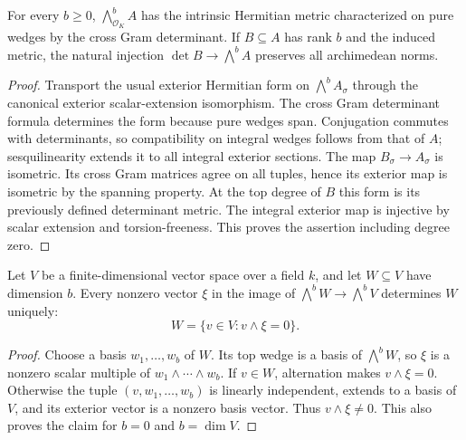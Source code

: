 \begin{lemma}
\label{lem:intrinsic-exterior-metric}
\leanok
For every $b\geq0$, $\bigwedge^b_{\mathcal O_K}A$ has the intrinsic
Hermitian metric characterized on pure wedges by the cross Gram determinant.
If $B\subseteq A$ has rank $b$ and the induced metric, the natural injection
$\det B\longrightarrow\bigwedge^b A$ preserves all archimedean norms.
\end{lemma}
\begin{proof}
Transport the usual exterior Hermitian form on $\bigwedge^b A_\sigma$
through the canonical exterior scalar-extension isomorphism. The cross Gram
determinant formula determines the form because pure wedges span. Conjugation
commutes with determinants, so compatibility on integral wedges follows from
that of $A$; sesquilinearity extends it to all integral exterior sections.
The map $B_\sigma\to A_\sigma$ is isometric. Its cross Gram matrices agree
on all tuples, hence its exterior map is isometric by the spanning property.
At the top degree of $B$ this form is its previously defined determinant
metric. The integral exterior map is injective by scalar extension and
torsion-freeness. This proves the assertion including degree zero.
\end{proof}

\begin{lemma}
\label{lem:plucker-recovery}\leanok
{}
Let $V$ be a finite-dimensional vector space over a field $k$, and let
$W\subseteq V$ have dimension $b$. Every nonzero vector $\xi$ in the
image of $\bigwedge^b W\to\bigwedge^b V$ determines $W$ uniquely:
\[
 W=\{v\in V:v\wedge\xi=0\}.
\]
\end{lemma}
\begin{proof}
Choose a basis $w_1,\ldots,w_b$ of $W$. Its top wedge is a basis of
$\bigwedge^b W$, so $\xi$ is a nonzero scalar multiple of
$w_1\wedge\cdots\wedge w_b$. If $v\in W$, alternation makes
$v\wedge\xi=0$. Otherwise the tuple $(v,w_1,\ldots,w_b)$ is linearly
independent, extends to a basis of $V$, and its exterior vector is a
nonzero basis vector. Thus $v\wedge\xi\ne0$. This also proves the
claim for $b=0$ and $b=\dim V$.
\end{proof}

